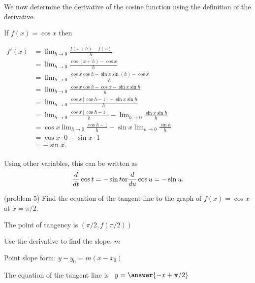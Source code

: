 \documentclass[handout]{ximera}
\begin{document}

We now determine the derivative of the cosine function using the definition of the derivative.

\begin{explanation}
If $f(x) = \cos x$ then\\
\begin{center}
$\begin{aligned}
f'(x) &= \lim_{h \to 0} \frac{f(x+h)-f(x)}{h} \\[5pt]
&= \lim_{h \to 0} \frac{\cos(x+h) - \cos x}{h}\\[5pt]
&=  \lim_{h \to 0} \frac{\cos x\cos h - \sin x\sin(h) - \cos x}{h}\\[5pt]
&=  \lim_{h \to 0} \frac{\cos x\cos h - \cos x - \sin x\sin h}{h}\\[5pt]
&=  \lim_{h \to 0} \frac{\cos x[\cos h -1] - \sin x\sin h}{h}\\[5pt]
&=  \lim_{h \to 0} \frac{\cos x[\cos h -1]}{h} - \lim_{h \to 0}\frac{\sin x\sin h}{h}\\[5pt]
&=  \cos x\lim_{h \to 0} \frac{\cos h -1}{h} - \sin x\lim_{h \to 0}\frac{\sin h}{h}\\[5pt]
&=   \cos x \cdot 0 - \sin x\cdot 1\\[5pt]
&= -\sin x.\\[5pt]
\end{aligned}$
\end{center}
Using other variables, this can be written as
\[
\frac{d}{dt} \cos t = -\sin t \\
\text{or}\\
\frac{d}{du} \cos u = -\sin u.
\]

\end{explanation}


\begin{problem}(problem 5)
Find the equation of the tangent line to the graph of $f(x) = \cos x$ at $x=\pi/2.$


\begin{hint}
The point of tangency is $(\pi/2, f(\pi/2))$
\end{hint}
\begin{hint}
Use the derivative to find the slope, $m$
\end{hint}
\begin{hint}
Point slope form: $y-y_0 = m(x-x_0)$
\end{hint}

The equation of the tangent line is \ $y = \answer{-x + \pi/2}$

\end{problem}
\end{document}
